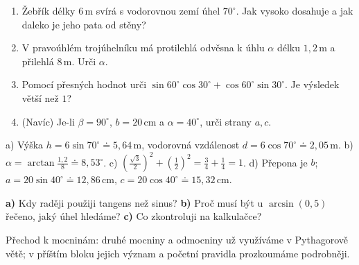 \documentclass[11pt,a4paper]{article}
\begin{document}
\newpage
{}
\begin{zadaniReseniBox}[title={Samostatná práce 1}]
\begin{enumerate}[label=\alph*)]
\item Žebřík délky $6\,\mathrm m$ svírá s vodorovnou zemí úhel $70^\circ$.
Jak vysoko dosahuje a jak daleko je jeho pata od stěny?
\item V pravoúhlém trojúhelníku má protilehlá odvěsna k úhlu $\alpha$
délku $1{,}2\,\mathrm m$ a přilehlá $8\,\mathrm m$. Urči $\alpha$.
\item Pomocí přesných hodnot urči $\sin60^\circ\cos30^\circ+
\cos60^\circ\sin30^\circ$. Je výsledek větší než $1$?
\item (Navíc) Je-li $\beta=90^\circ$, $b=20\,\mathrm{cm}$ a $\alpha=40^\circ$,
urči strany $a,c$.
\end{enumerate}
\tcblower
a) Výška $h=6\sin70^\circ\doteq5{,}64\,\mathrm m$,
vodorovná vzdálenost $d=6\cos70^\circ\doteq2{,}05\,\mathrm m$.
b) $\alpha=\arctan\frac{1{,}2}{8}\doteq8{,}53^\circ$.
c) $(\frac{\sqrt3}2)^2+(\frac12)^2=\frac34+\frac14=1$.
d) Přepona je $b$; $a=20\sin40^\circ\doteq12{,}86\,\mathrm{cm}$,
$c=20\cos40^\circ\doteq15{,}32\,\mathrm{cm}$.
\end{zadaniReseniBox}

\begin{zadaniBox}[title={Samostatná práce 2}]
\textbf{a)} Kdy raději použiji tangens než sinus?
\quad \textbf{b)} Proč musí být u $\arcsin(0{,}5)$ řečeno, jaký úhel hledáme?
\quad \textbf{c)} Co zkontroluji na kalkulačce?
\end{zadaniBox}
Přechod k mocninám: druhé mocniny a odmocniny už využíváme v Pythagorově větě;
v příštím bloku jejich význam a početní pravidla prozkoumáme podrobněji.
\end{document}
